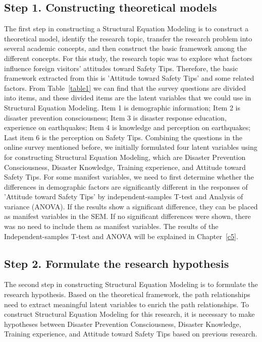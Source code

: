 \subsection{Step 1. Constructing theoretical models}
The first step in constructing a Structural Equation Modeling is to construct a theoretical model, identify the research topic, transfer the research problem into several academic concepts, and then construct the basic framework among the different concepts. For this study, the research topic was to explore what factors influence foreign visitors' attitudes toward Safety Tips. Therefore, the basic framework extracted from this is 'Attitude toward Safety Tips' and some related factors. From Table~\ref{table1} we can find that the survey questions are divided into items, and these divided items are the latent variables that we could use in Structural Equation Modeling. Item 1 is demographic information; Item 2 is disaster prevention consciousness; Item 3 is disaster response education, experience on earthquakes; Item 4 is knowledge and perception on earthquakes; Last item 6 is the perception on Safety Tips. Combining the questions in the online survey mentioned before, we initially formulated four latent variables using for constructing Structural Equation Modeling, which are Disaster Prevention Consciousness, Disaster Knowledge, Training experience, and Attitude toward Safety Tips. For some manifest variables, we need to first determine whether the differences in demographic factors are significantly different in the responses of 'Attitude toward Safety Tips' by independent-samples T-test and Analysis of variance (ANOVA). If the results show a significant difference, they can be placed as manifest variables in the SEM. If no significant differences were shown, there was no need to include them as manifest variables. The results of the Independent-samples T-test and ANOVA will be explained in Chapter~\ref{c5}. 


\subsection{Step 2. Formulate the research hypothesis}
The second step in constructing Structural Equation Modeling is to formulate the research hypothesis. Based on the theoretical framework, the path relationships need to extract meaningful latent variables to enrich the path relationships. To construct Structural Equation Modeling for this research, it is necessary to make hypotheses between Disaster Prevention Consciousness, Disaster Knowledge, Training experience, and Attitude toward Safety Tips based on previous research. 

